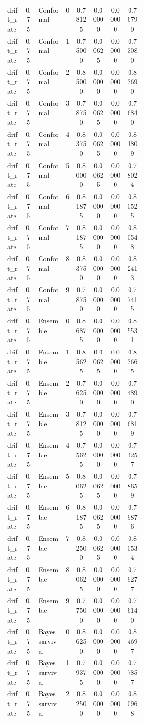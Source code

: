 \documentclass{article}
\begin{document}
\begin{center}
\begin{longtable}{p{0.13\linewidth}cp{0.20\linewidth}ccccc}
drift\_rate & 0.75 & Conformal & 0 & 0.78125 & 0.00000 & 0.00000 & 0.76790\\
drift\_rate & 0.75 & Conformal & 1 & 0.75000 & 0.00625 & 0.00000 & 0.73080\\
drift\_rate & 0.75 & Conformal & 2 & 0.85000 & 0.00000 & 0.00000 & 0.83690\\
drift\_rate & 0.75 & Conformal & 3 & 0.78750 & 0.00625 & 0.00000 & 0.76840\\
drift\_rate & 0.75 & Conformal & 4 & 0.83750 & 0.00625 & 0.00000 & 0.81809\\
drift\_rate & 0.75 & Conformal & 5 & 0.80000 & 0.00625 & 0.00000 & 0.78024\\
drift\_rate & 0.75 & Conformal & 6 & 0.81875 & 0.00000 & 0.00000 & 0.80525\\
drift\_rate & 0.75 & Conformal & 7 & 0.81875 & 0.00000 & 0.00000 & 0.80548\\
drift\_rate & 0.75 & Conformal & 8 & 0.83750 & 0.00000 & 0.00000 & 0.82413\\
drift\_rate & 0.75 & Conformal & 9 & 0.78750 & 0.00000 & 0.00000 & 0.77415\\
drift\_rate & 0.75 & Ensemble & 0 & 0.86875 & 0.00000 & 0.00000 & 0.85531\\
drift\_rate & 0.75 & Ensemble & 1 & 0.85625 & 0.00625 & 0.00000 & 0.83665\\
drift\_rate & 0.75 & Ensemble & 2 & 0.76250 & 0.00000 & 0.00000 & 0.74890\\
drift\_rate & 0.75 & Ensemble & 3 & 0.78125 & 0.00000 & 0.00000 & 0.76819\\
drift\_rate & 0.75 & Ensemble & 4 & 0.75625 & 0.00000 & 0.00000 & 0.74257\\
drift\_rate & 0.75 & Ensemble & 5 & 0.80625 & 0.00625 & 0.00000 & 0.78659\\
drift\_rate & 0.75 & Ensemble & 6 & 0.81875 & 0.00625 & 0.00000 & 0.79876\\
drift\_rate & 0.75 & Ensemble & 7 & 0.82500 & 0.00625 & 0.00000 & 0.80534\\
drift\_rate & 0.75 & Ensemble & 8 & 0.80625 & 0.00000 & 0.00000 & 0.79277\\
drift\_rate & 0.75 & Ensemble & 9 & 0.77500 & 0.00000 & 0.00000 & 0.76140\\
drift\_rate & 0.75 & Bayes survival & 0 & 0.86250 & 0.00000 & 0.00000 & 0.84697\\
drift\_rate & 0.75 & Bayes survival & 1 & 0.79375 & 0.00000 & 0.00000 & 0.77857\\
drift\_rate & 0.75 & Bayes survival & 2 & 0.82500 & 0.00000 & 0.00000 & 0.80968\\

\end{longtable}
\end{center}
\end{document}
